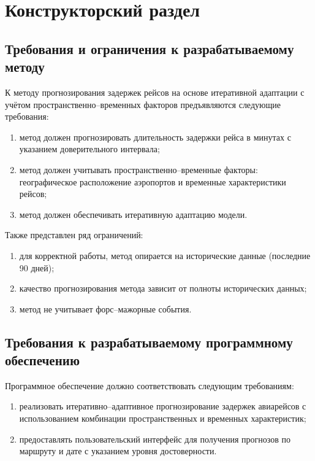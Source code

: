 \chapter{Конструкторский раздел}


\section{Требования и ограничения к разрабатываемому методу}

К методу прогнозирования задержек рейсов на основе итеративной адаптации с учётом пространственно--временных факторов предъявляются следующие требования:

\begin{enumerate}[label=\arabic*)]
    \item метод должен прогнозировать длительность задержки рейса в минутах с указанием доверительного интервала;
    \item метод должен учитывать пространственно--временные факторы: географическое расположение аэропортов и временные характеристики рейсов;
    \item метод должен обеспечивать итеративную адаптацию модели.
\end{enumerate}

Также представлен ряд ограничений:
\begin{enumerate}[label=\arabic*)]
    \item для корректной работы, метод опирается на исторические данные (последние 90 дней);
    \item качество прогнозирования метода зависит от полноты исторических данных;
    \item метод не учитывает форс--мажорные события.
\end{enumerate}


\section{Требования к разрабатываемому программному обеспечению}

Программное обеспечение должно соответствовать следующим требованиям:

\begin{enumerate}[label=\arabic*)]
    \item реализовать итеративно--адаптивное прогнозирование задержек авиарейсов с использованием комбинации пространственных и временных характеристик;
    \item предоставлять пользовательский интерфейс для получения прогнозов по маршруту и дате с указанием уровня достоверности.
\end{enumerate}


